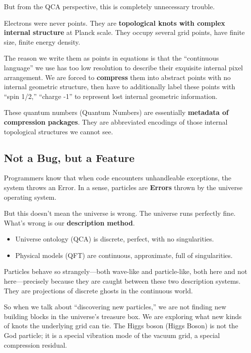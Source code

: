 \documentclass[11pt,a4paper,twoside]{book}
\begin{document}
But from the QCA perspective, this is completely unnecessary trouble.

Electrons were never points. They are \textbf{topological knots with complex internal structure} at Planck scale. They occupy several grid points, have finite size, finite energy density.

The reason we write them as points in equations is that the ``continuous language'' we use has too low resolution to describe their exquisite internal pixel arrangement. We are forced to \textbf{compress} them into abstract points with no internal geometric structure, then have to additionally label these points with ``spin 1/2,'' ``charge -1'' to represent lost internal geometric information.

These quantum numbers (Quantum Numbers) are essentially \textbf{metadata of compression packages}. They are abbreviated encodings of those internal topological structures we cannot see.

\subsection{Not a Bug, but a Feature}

Programmers know that when code encounters unhandleable exceptions, the system throws an Error. In a sense, particles are \textbf{Errors} thrown by the universe operating system.

But this doesn't mean the universe is wrong. The universe runs perfectly fine. What's wrong is our \textbf{description method}.

\begin{itemize}
\item Universe ontology (QCA) is discrete, perfect, with no singularities.

\item Physical models (QFT) are continuous, approximate, full of singularities.
\end{itemize}

Particles behave so strangely---both wave-like and particle-like, both here and not here---precisely because they are caught between these two description systems. They are projections of discrete ghosts in the continuous world.

So when we talk about ``discovering new particles,'' we are not finding new building blocks in the universe's treasure box. We are exploring what new kinds of knots the underlying grid can tie. The Higgs boson (Higgs Boson) is not the God particle; it is a special vibration mode of the vacuum grid, a special compression residual.
\end{document}
